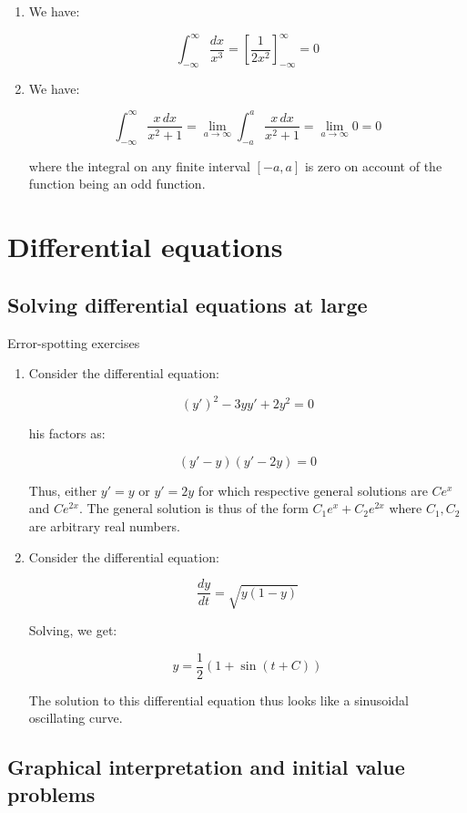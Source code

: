 \documentclass[10pt]{amsart}
\begin{document}
\begin{enumerate}
\item We have:

  $$\int_{-\infty}^\infty \frac{dx}{x^3} = \left[\frac{1}{2x^2}\right]_{-\infty}^\infty = 0$$

\item We have:

  $$\int_{-\infty}^\infty \frac{x \, dx}{x^2 + 1} = \lim_{a \to \infty} \int_{-a}^a \frac{x \, dx}{x^2 + 1} = \lim_{a \to \infty} 0 = 0$$

  where the integral on any finite interval $[-a,a]$ is zero on account of the function being an odd function.

\end{enumerate}

\section{Differential equations}

\subsection{Solving differential equations at large}

Error-spotting exercises

\begin{enumerate}
\item Consider the differential equation:

  $$(y')^2 - 3yy' + 2y^2 = 0$$

  his factors as:

  $$(y' - y)(y' - 2y) = 0$$

  Thus, either $y' = y$ or $y' = 2y$ for which respective general
  solutions are $Ce^x$ and $Ce^{2x}$. The general solution is thus of
  the form $C_1e^x +C_2e^{2x}$ where $C_1,C_2$ are arbitrary real
  numbers.

\item Consider the differential equation:

  $$\frac{dy}{dt} = \sqrt{y(1 - y)}$$

  Solving, we get:

  $$y = \frac{1}{2}(1 + \sin(t + C))$$

  The solution to this differential equation thus looks like a sinusoidal oscillating curve.
\end{enumerate}

\subsection{Graphical interpretation and initial value problems}
\end{document}
